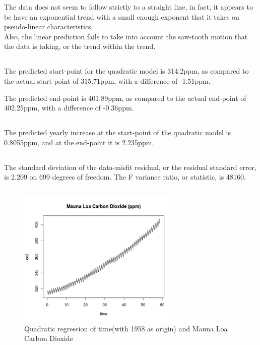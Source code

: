 \documentclass[paper=a4, fontsize=11pt]{scrartcl}
\numberwithin{equation}{section} %
\numberwithin{figure}{section} %
\numberwithin{table}{section} %
\begin{document}
The data does not seem to follow strictly to a straight line, in fact, it appears to be have an exponential trend with a small enough exponent that it takes on pseudo-linear characteristics.\\

Also, the linear prediction fails to take into account the saw-tooth motion that the data is taking, or the trend within the trend.

\subsection{}

The predicted start-point for the quadratic model is 314.2ppm, as compared to the actual start-point of 315.71ppm, with a difference of -1.51ppm.

The predicted end-point is 401.89ppm, as compared to the actual end-point of 402.25ppm, with a difference of -0.36ppm.

\subsection{}
The predicted yearly increase at the start-point of the quadratic model is 0.8055ppm, and at the end-point it is 
2.235ppm.

\subsection{}
The standard deviation of the data-misfit residual, or the residual standard error, is 2.209 on 699 degrees of freedom. The F variance ratio, or statistic, is 48160.

\subsection{}

\begin{figure}[htp]
	\centering
	\includegraphics[width=0.7\textwidth, clip]{q1hTime.png} 
	\caption{Quadratic regression of time(with 1958 as origin) and Mauna Loa Carbon Dioxide}
\end{figure}
\end{document}
